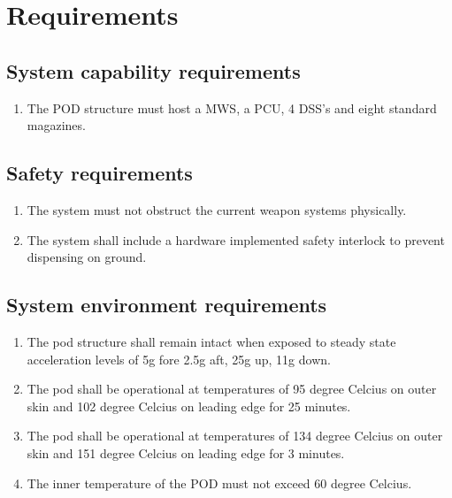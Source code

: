 \documentclass[Main]{subfiles}
\begin{document}
\setcounter{chapter}{2}
\chapter{Requirements}

\section{System capability requirements}
\begin{enumerate}[{SR}-1.1]
\item The POD structure must host a MWS, a PCU, 4 DSS's and eight standard magazines.

\end{enumerate}

\section{Safety requirements}
\begin{enumerate}[{SR}-2.1]
\item The system must not obstruct the current weapon systems physically.

\item The system shall include a hardware implemented safety interlock to prevent dispensing on ground.

\end{enumerate}

\section{System environment requirements} 
\label{sec:SER}

\begin{enumerate}[{SR}-3.1]
\item The pod structure shall remain intact when exposed to steady state acceleration levels of 5g fore 2.5g aft, 25g up, 11g down.

\item The pod shall be operational at temperatures of 95 degree Celcius on outer skin and 102 degree Celcius on leading edge for 25 minutes.

\item The pod shall be operational at temperatures of 134 degree Celcius on outer skin and 151 degree Celcius on leading edge for 3 minutes.

\item The inner temperature of the POD must not exceed 60 degree Celcius.

\end{enumerate}
\end{document}
